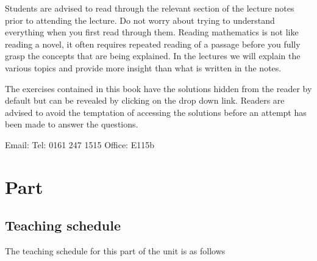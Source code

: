 \documentclass[letterpaper,10pt,english]{jupyterBook}
\let\sphinxpxdimen\pdfpxdimen\else\newdimen\sphinxpxdimen
\begin{document}
Students are advised to read through the relevant section of the lecture notes prior to attending the lecture. Do not worry about trying to understand everything when you first read through them. Reading mathematics is not like reading a novel, it often requires repeated reading of a passage before you fully grasp the concepts that are being explained. In the lectures we will explain the various topics and provide more insight than what is written in the notes.

\sphinxAtStartPar
The exercises contained in this book have the solutions hidden from the reader by default but can be revealed by clicking on the drop down link. Readers are advised to avoid the temptation of accessing the solutions before an attempt has been made to answer the questions.

\begin{DUlineblock}{0em}
\item[] 
\end{DUlineblock}

\noindent{\sphinxincludegraphics[width=125\sphinxpxdimen]{{jon_shiach}.jpeg}\hspace*{\fill}}

\sphinxAtStartPar
{}
Email:  
Tel: 0161 247 1515 
Office: E115b 

\sphinxstepscope


\part{Part}

\sphinxstepscope


\chapter{Teaching schedule}
\label{\detokenize{0_Preamble/0.1_Teaching_schedule:teaching-schedule}}\label{\detokenize{0_Preamble/0.1_Teaching_schedule:teaching-schedule-section}}\label{\detokenize{0_Preamble/0.1_Teaching_schedule::doc}}
\sphinxAtStartPar
The teaching schedule for this part of the unit is as follows
\end{document}

